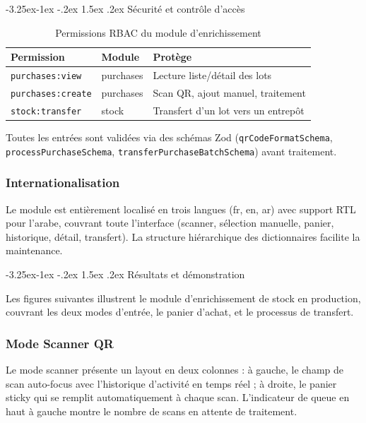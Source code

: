 \documentclass[12pt,a4paper,openany]{report}
\makeatletter
\renewcommand\subsection{\@startsection{subsection}{2}{\z@}%
  {-3.25ex\@plus -1ex \@minus -.2ex}%
  {1.5ex \@plus .2ex}%
  {\needspace{8\baselineskip}\normalfont\large\bfseries\color{primary!80!black}}}
\newcommand{\code}[1]{\texttt{#1}}
\makeatother
\begin{document}
\subsection{Sécurité et contrôle d'accès}

\begin{table}[H]
\centering
{}
\begin{tabularx}{\textwidth}{llX}
\toprule
\rowcolor{headerblue!20}
\textbf{Permission} & \textbf{Module} & \textbf{Protège} \\
\midrule
\texttt{purchases:view} & purchases & Lecture liste/détail des lots \\
\texttt{purchases:create} & purchases & Scan QR, ajout manuel, traitement \\
\texttt{stock:transfer} & stock & Transfert d'un lot vers un entrepôt \\
\bottomrule
\end{tabularx}
\caption{Permissions RBAC du module d'enrichissement}
\end{table}

Toutes les entrées sont validées via des schémas Zod (\code{qrCodeFormatSchema}, \code{processPurchaseSchema}, \code{transferPurchaseBatchSchema}) avant traitement.

\subsubsection{Internationalisation}

Le module est entièrement localisé en trois langues (fr, en, ar) avec support RTL pour l'arabe, couvrant toute l'interface (scanner, sélection manuelle, panier, historique, détail, transfert). La structure hiérarchique des dictionnaires facilite la maintenance. 

\subsection{Résultats et démonstration}

Les figures suivantes illustrent le module d'enrichissement de stock en production, couvrant les deux modes d'entrée, le panier d'achat, et le processus de transfert.

\subsubsection{Mode Scanner QR}

Le mode scanner présente un layout en deux colonnes : à gauche, le champ de scan auto-focus avec l'historique d'activité en temps réel ; à droite, le panier sticky qui se remplit automatiquement à chaque scan. L'indicateur de queue en haut à gauche montre le nombre de scans en attente de traitement.
\end{document}
